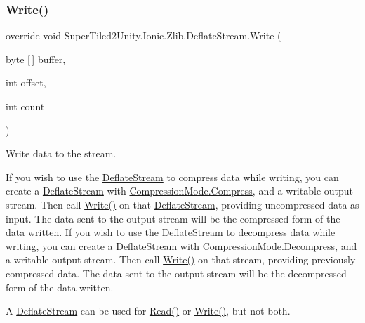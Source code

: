 \subsubsection{\texorpdfstring{Write()}{Write()}}
{\footnotesize\ttfamily override void Super\+Tiled2\+Unity.\+Ionic.\+Zlib.\+Deflate\+Stream.\+Write (\begin{DoxyParamCaption}\item[{byte \mbox{[}$\,$\mbox{]}}]{buffer,  }\item[{int}]{offset,  }\item[{int}]{count }\end{DoxyParamCaption})}



Write data to the stream. 

If you wish to use the {\ttfamily \mbox{\hyperlink{class_super_tiled2_unity_1_1_ionic_1_1_zlib_1_1_deflate_stream}{Deflate\+Stream}}} to compress data while writing, you can create a {\ttfamily \mbox{\hyperlink{class_super_tiled2_unity_1_1_ionic_1_1_zlib_1_1_deflate_stream}{Deflate\+Stream}}} with {\ttfamily \mbox{\hyperlink{namespace_super_tiled2_unity_1_1_ionic_1_1_zlib_ad5b7635d92497e1c905e5de82eb1c6b1a8fa4fcfcda70410e089984d5f51ae97d}{Compression\+Mode.\+Compress}}}, and a writable output stream. Then call {\ttfamily \mbox{\hyperlink{class_super_tiled2_unity_1_1_ionic_1_1_zlib_1_1_deflate_stream_a751d2c556423679f9267bc2a45ce3539}{Write()}}} on that {\ttfamily \mbox{\hyperlink{class_super_tiled2_unity_1_1_ionic_1_1_zlib_1_1_deflate_stream}{Deflate\+Stream}}}, providing uncompressed data as input. The data sent to the output stream will be the compressed form of the data written. If you wish to use the {\ttfamily \mbox{\hyperlink{class_super_tiled2_unity_1_1_ionic_1_1_zlib_1_1_deflate_stream}{Deflate\+Stream}}} to decompress data while writing, you can create a {\ttfamily \mbox{\hyperlink{class_super_tiled2_unity_1_1_ionic_1_1_zlib_1_1_deflate_stream}{Deflate\+Stream}}} with {\ttfamily \mbox{\hyperlink{namespace_super_tiled2_unity_1_1_ionic_1_1_zlib_ad5b7635d92497e1c905e5de82eb1c6b1a6d2861192fdf4370bcf95c099be0f2f0}{Compression\+Mode.\+Decompress}}}, and a writable output stream. Then call {\ttfamily \mbox{\hyperlink{class_super_tiled2_unity_1_1_ionic_1_1_zlib_1_1_deflate_stream_a751d2c556423679f9267bc2a45ce3539}{Write()}}} on that stream, providing previously compressed data. The data sent to the output stream will be the decompressed form of the data written. 

A {\ttfamily \mbox{\hyperlink{class_super_tiled2_unity_1_1_ionic_1_1_zlib_1_1_deflate_stream}{Deflate\+Stream}}} can be used for {\ttfamily \mbox{\hyperlink{class_super_tiled2_unity_1_1_ionic_1_1_zlib_1_1_deflate_stream_a7adaf1072e4bc9be5914923eb2bc0636}{Read()}}} or {\ttfamily \mbox{\hyperlink{class_super_tiled2_unity_1_1_ionic_1_1_zlib_1_1_deflate_stream_a751d2c556423679f9267bc2a45ce3539}{Write()}}}, but not both. 


